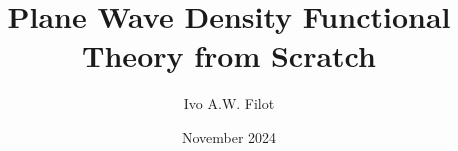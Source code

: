 \documentclass[9pt]{extarticle}
\title{Plane Wave Density Functional Theory from Scratch}
\author{Ivo A.W. Filot}
\date{November 2024}
\begin{document}
\maketitle

\pagestyle{fancy}
\lfoot{}
\cfoot{\thepage}

\begin{multicols*}{2}
    \tableofcontents

    
    
    
    
    
    

    \printbibliography

\end{multicols*}
\end{document}
